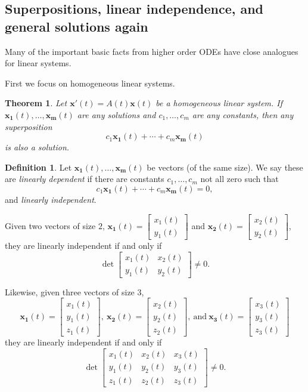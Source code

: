 \documentclass[12pt]{amsart}
\numberwithin{equation}{section}
\theoremstyle{plain} %
\newtheorem{thm}[equation]{Theorem}
\theoremstyle{definition}
\newtheorem{defn}[equation]{Definition}
\theoremstyle{remark}
\begin{document}
\subsection*{Superpositions, linear independence, and general solutions again}

Many of the important basic facts from higher order ODEs have close analogues for linear systems.

First we focus on homogeneous linear systems.

\begin{thm} Let $\mathbf{x'}(t) =A(t) \mathbf{x}(t)$ be a homogeneous linear system. If $\mathbf{x_1}(t),\dots,\mathbf{x_m}(t)$ are any solutions and $c_1,\dots,c_m$ are any constants, then any superposition
\[ c_1 \mathbf{x_1}(t)+ \cdots + c_m\mathbf{x_m}(t)\]
is also a solution.
\end{thm}

\begin{defn}
Let $\mathbf{x_1}(t),\dots,\mathbf{x_m}(t)$ be vectors (of the same size). We say these are \emph{linearly dependent} if there are constants $c_1,\dots,c_m$ not all zero such that 
\[ c_1 \mathbf{x_1}(t)+ \cdots + c_m\mathbf{x_m}(t) =0, \]
and \emph{linearly independent}.
\end{defn}

Given two vectors of size $2$, $\mathbf{x_1}(t)=\begin{bmatrix} x_1(t) \\ y_1(t)\end{bmatrix}$ and $\mathbf{x_2}(t)=\begin{bmatrix} x_2(t) \\ y_2(t)\end{bmatrix}$, they are linearly independent if and only if
\[ \det \begin{bmatrix} x_1(t) & x_2(t) \\ y_1(t) & y_2(t)\end{bmatrix} \neq 0.\]

Likewise, given three vectors of size $3$, \[ \mathbf{x_1}(t)=\begin{bmatrix} x_1(t) \\ y_1(t) \\ z_1(t) \end{bmatrix}, \ \mathbf{x_2}(t)=\begin{bmatrix} x_2(t) \\ y_2(t) \\ z_2(t) \end{bmatrix}, \ \text{and}  \ \mathbf{x_3}(t)=\begin{bmatrix} x_3(t) \\ y_3(t) \\ z_3(t) \end{bmatrix}\] they are linearly independent if and only if
\[ \det \begin{bmatrix} x_1(t) & x_2(t) & x_3(t) \\ y_1(t) & y_2(t) & y_3(t) \\ z_1(t) & z_2(t) & z_3(t) \end{bmatrix} \neq 0.\]
\end{document}
